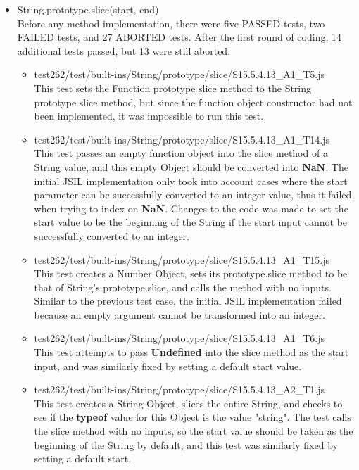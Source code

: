 \documentclass[a4paper,11pt,twoside]{report}
\begin{document}
\begin{itemize}
\item String.prototype.slice(start, end) \\
Before any method implementation, there were five PASSED tests, two FAILED tests, and 27 ABORTED tests. After the first round of coding, 14 additional tests passed, but 13 were still aborted. 
\begin{itemize}
\item test262/test/built-ins/String/prototype/slice/S15.5.4.13\_A1\_T5.js \\
This test sets the Function prototype slice method to the String prototype slice method, but since the function object constructor had not been implemented, it was impossible to run this test.
\item test262/test/built-ins/String/prototype/slice/S15.5.4.13\_A1\_T14.js \\
This test passes an empty function object into the slice method of a String value, and this empty Object should be converted into \textbf{NaN}. The initial JSIL implementation only took into account cases where the start parameter can be successfully converted to an integer value, thus it failed when trying to index on \textbf{NaN}. Changes to the code was made to set the start value to be the beginning of the String if the start input cannot be successfully converted to an integer.
\item test262/test/built-ins/String/prototype/slice/S15.5.4.13\_A1\_T15.js \\
This test creates a Number Object, sets its prototype.slice method to be that of String's prototype.slice, and calls the method with no inputs. Similar to the previous test case, the initial JSIL implementation failed because an empty argument cannot be transformed into an integer.
\item test262/test/built-ins/String/prototype/slice/S15.5.4.13\_A1\_T6.js \\
This test attempts to pass \textbf{Undefined} into the slice method as the start input, and was similarly fixed by setting a default start value.
\item test262/test/built-ins/String/prototype/slice/S15.5.4.13\_A2\_T1.js \\
This test creates a String Object, slices the entire String, and checks to see if the \textbf{typeof} value for this Object is the value "string". The test calls the slice method with no inputs, so the start value should be taken as the beginning of the String by default, and this test was similarly fixed by setting a default start.
\end{itemize}


\end{itemize}
\end{document}
